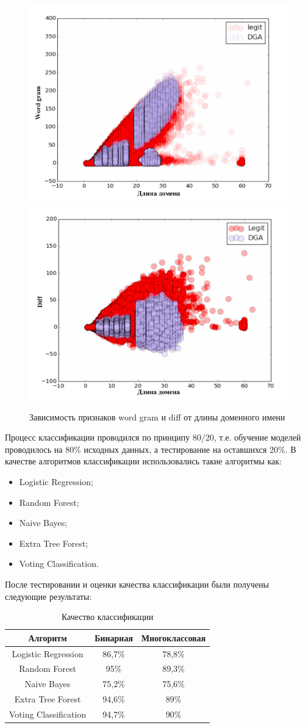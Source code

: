     \begin{figure}[H]
        \left
        \includegraphics[width=0.5\linewidth]{images/linear_class/word_gramm.png}
        \right
        \includegraphics[width=0.5\linewidth]{images/linear_class/diff.png}
        \caption{Зависимость признаков word gram и diff от длины доменного имени} \label{word_gram_diff}
    \end{figure}

    Процесс классификации проводился по принципу 80/20, т.е. обучение моделей проводилось на 80\% исходных данных, а тестирование на оставшихся 20\%. В качестве алгоритмов классификации использовались такие алгоритмы как:
    \begin{itemize}
    \item Logistic Regression;
    \item Random Forest;
    \item Naive Bayes;
    \item Extra Tree Forest;
    \item Voting Classification.
    \end{itemize}

    После тестировании и оценки качества классификации были получены следующие результаты:
    \begin{table}[H]
    \centering
    \caption{Качество классификации}\label{}
    \begin{tabular}{@{}ccc@{}}
    \toprule
    Алгоритм              & Бинарная & Многоклассовая \\ \midrule
    Logistic Regression   & 86,7\%   & 78,8\%         \\
    Random Forest         & 95\%     & 89,3\%         \\
    Naive Bayes           & 75,2\%   & 75,6\%         \\
    Extra Tree Forest     & 94,6\%   & 89\%         \\
    Voting Classification & 94,7\%   & 90\%           \\ \bottomrule
    \end{tabular}
    \end{table}

